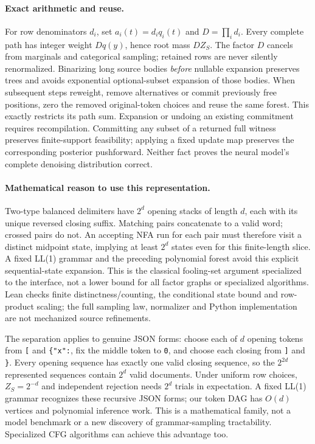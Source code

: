 \paragraph{Exact arithmetic and reuse.}
For row denominators $d_i$, set $a_i(t)=d_iq_i(t)$ and $D=\prod_i d_i$.
Every complete path has integer weight $Dq(y)$, hence root mass $DZ_S$.
The factor $D$ cancels from marginals and categorical sampling; retained rows
are never silently renormalized. Binarizing long source bodies \emph{before}
nullable expansion preserves trees and avoids exponential optional-subset
expansion of those bodies. When subsequent steps reweight, remove alternatives
or commit previously free positions, zero the removed original-token choices
and reuse the same forest. This exactly restricts its path sum. Expansion or
undoing an existing commitment requires recompilation. Committing any subset
of a returned full witness preserves finite-support feasibility; applying a
fixed update map preserves the corresponding posterior pushforward. Neither
fact proves the neural model's complete denoising distribution correct.

\paragraph{Mathematical reason to use this representation.}
Two-type balanced delimiters have $2^d$ opening stacks of length $d$, each with
its unique reversed closing suffix. Matching pairs concatenate to a valid word;
crossed pairs do not. An accepting NFA run for each pair must therefore visit
a distinct midpoint state, implying at least $2^d$ states even for this
finite-length slice. A fixed LL(1) grammar and the preceding polynomial forest
avoid this explicit sequential-state expansion. This is the classical
fooling-set argument specialized to the interface, not a lower bound for all
factor graphs or specialized algorithms. Lean checks finite distinctness/counting,
the conditional state bound and row-product scaling; the full sampling law,
normalizer and Python implementation are not mechanized source refinements.

The separation applies to genuine JSON forms: choose each of $d$ opening tokens
from \texttt{[} and \texttt{\{"x":}, fix the middle token to \texttt{0}, and choose
each closing from \texttt{]} and \texttt{\}}. Every opening sequence has exactly
one valid closing sequence, so the $2^{2d}$ represented sequences contain
$2^d$ valid documents. Under uniform row choices, $Z_S=2^{-d}$ and independent
rejection needs $2^d$ trials in expectation. A fixed LL(1) grammar recognizes
these recursive JSON forms; our token DAG has $O(d)$ vertices and polynomial
inference work. This is a mathematical family, not a model benchmark or a
new discovery of grammar-sampling tractability. Specialized CFG algorithms
can achieve this advantage too.

